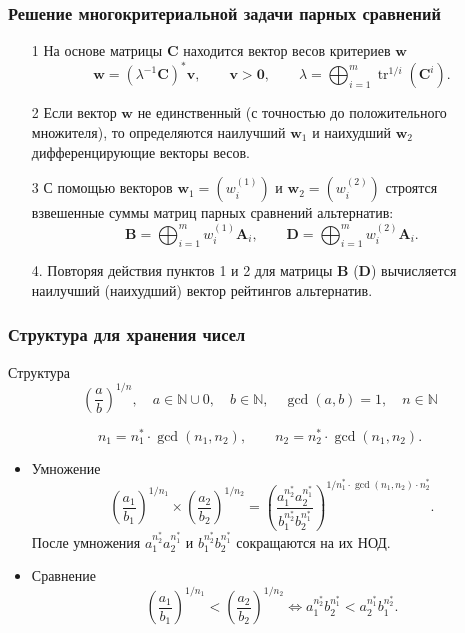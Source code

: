 \documentclass[ucs, notheorems, handout]{beamer}
\begin{document}
\begin{frame}
    \frametitle{Решение многокритериальной задачи парных сравнений}
    \begin{itemize}
        \item[1] На основе матрицы $\bm{C}$ находится вектор весов критериев $\bm{w}$
        $$\bm{w} =
        (\lambda^{-1}\bm{C})^{\ast}\bm{v},
        \qquad \bm{v}>\bm{0},
        \qquad \lambda =
        \bigoplus_{i=1}^{m}{\mathop\mathrm{tr}}^{1/i}(\bm{C}^{i}).$$
        \item[2] Если вектор $\bm{w}$ не единственный (с точностью до положительного множителя), то определяются наилучший $\bm{w}_{1}$ и наихудший $\bm{w}_{2}$ дифференцирующие векторы весов.
        \item[3]
        С помощью векторов $\bm{w}_{1}=(w_{i}^{(1)})$ и $\bm{w}_{2}=(w_{i}^{(2)})$ строятся взвешенные суммы матриц парных сравнений альтернатив:
        $$\bm{B} =
        \bigoplus_{i=1}^{m}w^{(1)}_{i}\bm{A}_{i},
        \qquad \bm{D} =
        \bigoplus_{i=1}^{m}w^{(2)}_{i}\bm{A}_{i}.$$
        \item[4.]
        Повторяя действия пунктов 1 и 2 для матрицы $\bm{B}$ ($\bm{D}$) вычисляется наилучший (наихудший)  вектор рейтингов альтернатив.
 
    \end{itemize}
\end{frame}

\begin{frame}
    \frametitle{Структура для хранения чисел}
    \begin{block}{Структура}
        $$\displaystyle \left(\frac{a}{b}\right)^{1/n}, \quad a \in \mathbb{N} \cup 0, \quad b \in \mathbb{N}, \quad \gcd(a, b) = 1, \quad n \in \mathbb{N}$$
    \end{block}
    $$n_1 =  n^*_1 \cdot \gcd(n_1, n_2), \qquad n_2 =  n^*_2 \cdot \gcd(n_1, n_2).$$
    \begin{itemize}
        \item Умножение
        $$ \left(\frac{a_1}{b_1}\right)^{1/n_1} \times \left(\frac{a_2}{b_2}\right)^{1/n_2} = \left(\frac{a_1^{n^*_2}a_2^{n^*_1}}{b_1^{n^*_2}b_2^{n^*_1}}\right)^{1/n^*_1\cdot \gcd(n_1, n_2) \cdot n^*_2}.$$
        После умножения $a_1^{n^*_2}a_2^{n^*_1}$ и $b_1^{n^*_2}b_2^{n^*_1}$ сокращаются на их НОД.
        \item Сравнение
        $$ \left(\frac{a_1}{b_1}\right)^{1/n_1} < \left(\frac{a_2}{b_2}\right)^{1/n_2} \Leftrightarrow
        {a_1^{n^*_2}}{b_2^{n^*_1}} < {a_2^{n^*_1}}{b_1^{n^*_2}}.$$
    \end{itemize}
\end{frame}
\end{document}
